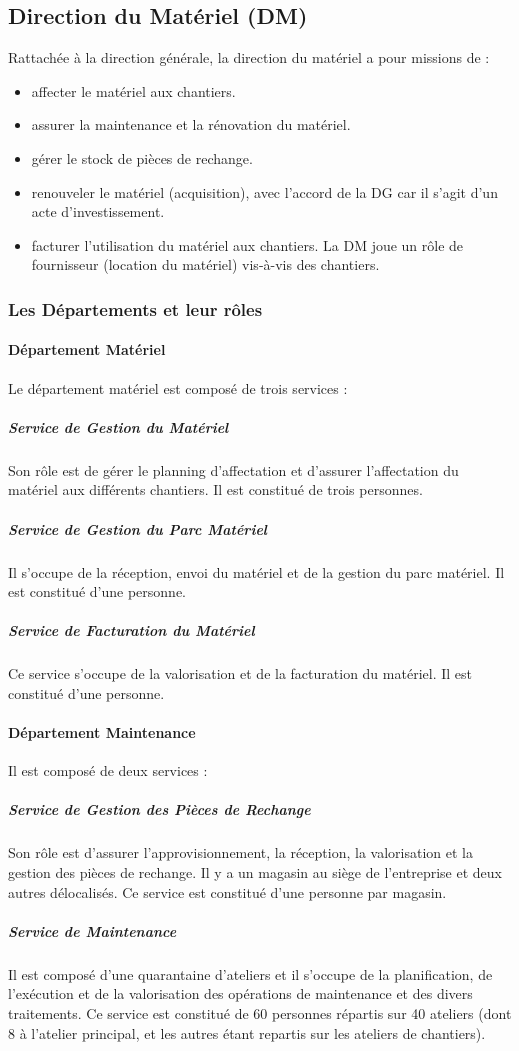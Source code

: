     \subsection{Direction du Matériel (DM)}
            Rattachée à la direction générale, la direction du matériel a pour missions de :
            \begin{itemize}
                \item affecter le matériel aux chantiers.
                \item assurer la maintenance et la rénovation du matériel.
                \item gérer le stock de pièces de rechange.
                \item renouveler le matériel (acquisition), avec l'accord de la DG car il s'agit d'un acte d'investissement.
                \item facturer l'utilisation du matériel aux chantiers. La DM joue un rôle de fournisseur (location du matériel) vis-à-vis des chantiers.
            \end{itemize}
            
        \subsubsection{Les Départements et leur rôles}
            \paragraph{Département Matériel}
                Le département matériel est composé de trois services :
                \subparagraph{Service de Gestion du Matériel}
                    Son rôle est de gérer le planning d'affectation et d'assurer l'affectation du matériel aux différents chantiers. Il est constitué de trois personnes.
                \subparagraph{Service de Gestion du Parc Matériel}
                    Il s'occupe de la réception, envoi du matériel et de la gestion du parc matériel. Il est constitué d'une personne.
                \subparagraph{Service de Facturation du Matériel}
                    Ce service s'occupe de la valorisation et de la facturation du matériel. Il est constitué d'une personne.        
                
            \paragraph{Département Maintenance}
                Il est composé de deux services :
                \subparagraph{Service de Gestion des Pièces de Rechange}
                    Son rôle est d'assurer l'approvisionnement, la réception, la valorisation et la gestion des pièces   de rechange. Il y a un magasin au siège de l'entreprise et deux autres délocalisés. Ce service est constitué d'une personne par magasin. 
                \subparagraph{Service de Maintenance}
                    Il est composé d'une quarantaine d'ateliers et il s'occupe de la planification, de l'exécution et de la valorisation des opérations de maintenance et des divers traitements. Ce service est constitué de 60 personnes répartis sur 40 ateliers (dont 8 à l'atelier principal, et les autres étant repartis sur les ateliers de chantiers).


